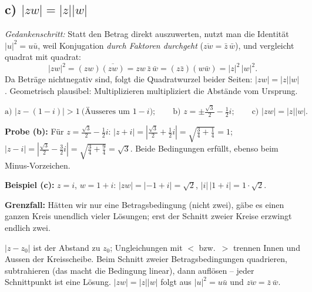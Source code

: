 \subsection*{c) $|zw|=|z||w|$}
\emph{Gedankenschritt:} Statt den Betrag direkt auszuwerten, nutzt man
die Identität $|u|^2=u\bar u$, weil Konjugation \emph{durch Faktoren
durchgeht} ($\overline{z w}=\bar z\,\bar w$), und vergleicht quadrat
mit quadrat:
\begin{equation*}
  |zw|^2=(zw)\overline{(zw)}=zw\,\bar z\,\bar w
  =(z\bar z)(w\bar w)=|z|^2\,|w|^2 .
\end{equation*}
Da Beträge nichtnegativ sind, folgt die Quadratwurzel beider Seiten:
$|zw|=|z||w|$. Geometrisch plausibel: Multiplizieren multipliziert die
Abstände vom Ursprung.

\begin{ergebnis}
\begin{equation*}
  \text{a) } |z-(1-i)|>1\ \text{(Äusseres um }1-i);\qquad
  \text{b) } z=\pm\tfrac{\sqrt3}{2}-\tfrac12 i;\qquad
  \text{c) } |zw|=|z||w|.
\end{equation*}
\end{ergebnis}

\begin{kontrolle}
\textbf{Probe (b):} Für $z=\frac{\sqrt3}{2}-\frac12 i$:
$|z+i|=|\frac{\sqrt3}{2}+\frac12 i|=\sqrt{\frac34+\frac14}=1$;
$|z-i|=|\frac{\sqrt3}{2}-\frac32 i|=\sqrt{\frac34+\frac94}=\sqrt3$.
Beide Bedingungen erfüllt, ebenso beim Minus-Vorzeichen. \checkmark

\textbf{Beispiel (c):} $z=i$, $w=1+i$: $|zw|=|-1+i|=\sqrt2$,
$|i|\,|1+i|=1\cdot\sqrt2$. \checkmark

\textbf{Grenzfall:} Hätten wir nur eine Betragsbedingung (nicht zwei),
gäbe es einen ganzen Kreis unendlich vieler Lösungen; erst der Schnitt
zweier Kreise erzwingt endlich zwei. \checkmark
\end{kontrolle}

\begin{merksatz}
$|z-z_0|$ ist der Abstand zu $z_0$; Ungleichungen mit $<$ bzw.\ $>$
trennen Innen und Aussen der Kreisscheibe. Beim Schnitt zweier
Betragsbedingungen quadrieren, subtrahieren (das macht die Bedingung
linear), dann auflösen -- jeder Schnittpunkt ist eine Lösung.
$|zw|=|z||w|$ folgt aus $|u|^2=u\bar u$ und
$\overline{zw}=\bar z\,\bar w$.
\end{merksatz}
